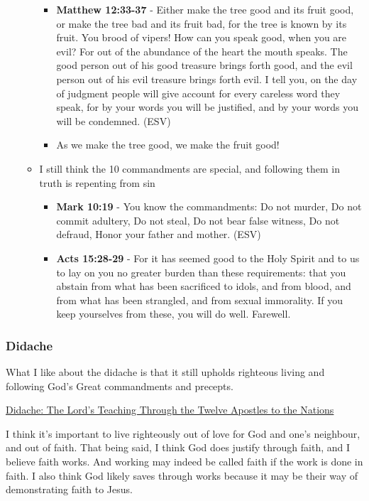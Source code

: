 \documentclass[11pt]{article}
\begin{document}
\begin{itemize}
\begin{itemize}
\begin{itemize}
\item \textbf{Matthew 12:33-37} - Either make the tree good and its fruit good, or make the tree bad and its fruit bad, for the tree is known by its fruit. You brood of vipers! How can you speak good, when you are evil? For out of the abundance of the heart the mouth speaks. The good person out of his good treasure brings forth good, and the evil person out of his evil treasure brings forth evil. I tell you, on the day of judgment people will give account for every careless word they speak, for by your words you will be justified, and by your words you will be condemned. (ESV)
\item As we make the tree good, we make the fruit good!
\end{itemize}
\item I still think the 10 commandments are special, and following them in truth is repenting from sin
\begin{itemize}
\item \textbf{Mark 10:19} - You know the commandments: Do not murder, Do not commit adultery, Do not steal, Do not bear false witness, Do not defraud, Honor your father and mother. (ESV)
\item \textbf{Acts 15:28-29} - For it has seemed good to the Holy Spirit and to us to lay on you no greater burden than these requirements: that you abstain from what has been sacrificed to idols, and from blood, and from what has been strangled, and from sexual immorality. If you keep yourselves from these, you will do well. Farewell.
\end{itemize}
\end{itemize}
\end{itemize}

\subsubsection{Didache}
\label{sec:orgad8c689}
What I like about the didache is that it still upholds righteous living and following God's Great commandments and precepts.

\href{https://www.earlychristianwritings.com/text/didache-roberts.html}{Didache: The Lord's Teaching Through the Twelve Apostles to the Nations}

I think it's important to live righteously out of love for God and one's neighbour, and out of faith.
That being said, I think God does justify through faith, and I believe faith works. And working may indeed be called faith if the work is done in faith.
I also think God likely saves through works because it may be their way of demonstrating faith to Jesus.
\end{document}
